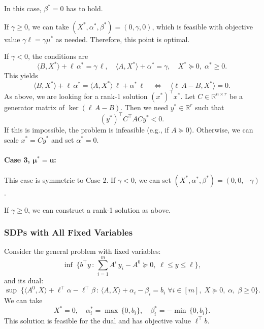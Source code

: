 \documentclass[10pt, a4paper]{article}
\newcommand{\suchthat}{\,:\,}
\newcommand{\skal}[2]{\langle{#1},{#2}\rangle}
\newcommand{\T}{^{\top}}
\newcommand{\R}{\mathds{R}}
\begin{document}
In this case, $\beta^* = 0$ has to hold.

If $\gamma \geq 0$, we can take
$(X^*, \alpha^*, \beta^*) = (0, \gamma, 0)$, which is feasible with
objective value $\gamma \ell = \gamma \mu^*$ as needed. Therefore, this
point is optimal.

If $\gamma < 0$, the conditions are
\[
\skal{B}{X^*} + \ell\, \alpha^* = \gamma\, \ell,\quad
\skal{A}{X^*} + \alpha^* = \gamma,\quad X^* \succeq 0,\; \alpha^* \geq 0.
\]
This yields
\[
\skal{B}{X^*} + \ell\, \alpha^* = \skal{A}{X^*}\, \ell + \alpha^*\, \ell
\quad\Leftrightarrow\quad
\skal{\ell\, A - B}{X^*} = 0.
\]
As above, we are looking for a rank-1 solution $(x^*)\T x^*$. Let
$C \in \R^{n \times r}$ be a generator matrix of $\ker(\ell\, A - B)$. Then
we need $y^* \in \R^r$ such that
\[
(y^*)\T C\T A C y^* < 0.
\]
If this is impossible, the problem is infeasible (e.g., if $A \succeq
0$). Otherwise, we can scale $x^* = C y^*$ and set $\alpha^* = 0$.

\paragraph{Case 3, $\boldsymbol{\mu^* = u}$:}

This case is symmetric to Case 2. If $\gamma < 0$, we can set
$(X^*, \alpha^*, \beta^*) = (0, 0, -\gamma)$.

If $\gamma \geq 0$, we can construct a rank-1 solution as above.

\subsubsection{SDPs with All Fixed Variables}

Consider the general problem with fixed variables:
\[
  \inf\; \{ b\T y \suchthat \sum_{i=1}^m A^i\, y_i - A^0 \succeq 0,\; \ell \leq y \leq \ell\},
\]
and its dual:
\[
  \sup\; \{\skal{A^0}{X} + \ell\T \alpha - \ell\T \beta \suchthat \skal{A}{X} +
  \alpha_i - \beta_i = b_i\; \forall i \in [m],\; X \succeq 0,\; \alpha,\; \beta \geq 0\}.
\]
We can take
\[
X^* = 0,\quad
\alpha^*_i = \max\,\{0, b_i\}, \quad
\beta^*_i = -\min\,\{0, b_i\}.
\]
This solution is feasible for the dual and has objective value $\ell\T b$.

\begin{small}
   
   
\end{small}
\end{document}
